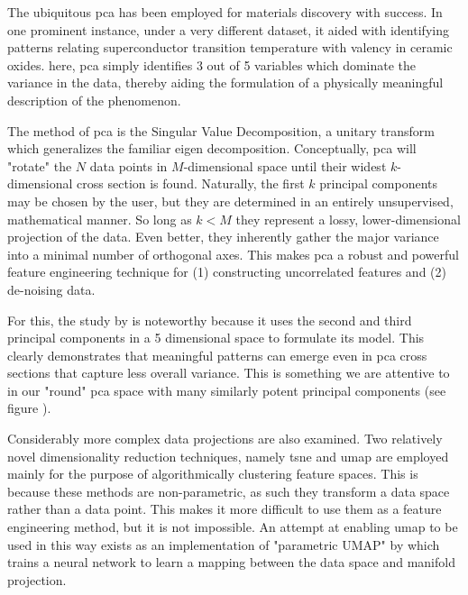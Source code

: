 \documentclass[twoside, twocolumn, 9pt, draft]{article}
\begin{document}
The ubiquitous \acrfull{pca} has been employed
for materials discovery with success. In one prominent instance, under
a very different dataset, it aided with identifying patterns relating
superconductor transition temperature with valency in ceramic
oxides\cite{rajan-2009-princ-compon}. here, pca simply identifies 3 out
of 5 variables which dominate the variance in the data, thereby aiding
the formulation of a physically meaningful description of the
phenomenon.

The method of \acrshort{pca} is the Singular Value Decomposition, a unitary
transform which generalizes the familiar eigen decomposition.
Conceptually, \acrshort{pca} will "rotate" the \(N\) data points in
\(M\)-dimensional space until their widest \(k\)-dimensional cross
section is found. Naturally, the first \(k\) principal components may
be chosen by the user, but they are determined in an entirely
unsupervised, mathematical manner. So long as \(k<M\) they represent a
lossy, lower-dimensional projection of the data. Even better, they
inherently gather the major variance into a minimal number of
orthogonal axes. This makes \acrshort{pca} a robust and powerful feature
engineering technique for (1) constructing uncorrelated
features\cite{mahoney-2009-cur-matrix} and (2) de-noising data.

For this, the study by \citet{rajan-2009-princ-compon} is noteworthy
because it uses the second and third principal components in a 5
dimensional space to formulate its model. This clearly demonstrates
that meaningful patterns can emerge even in \acrshort{pca} cross sections that
capture less overall variance. This is something we are attentive to
in our "round" \acrshort{pca} space with many similarly potent principal
components (see figure \label{fig:scree}).

Considerably more complex data projections are also examined. Two
relatively novel dimensionality reduction techniques, namely
\acrfull{tsne}
\cite{maaten-2008-visual-high} and \Acrfull{umap} \cite{mcinnes-2018-umap} are employed mainly for the
purpose of algorithmically clustering feature spaces. This is because
these methods are non-parametric, as such they transform a data space
rather than a data point. This makes it more difficult to use them as
a feature engineering method, but it is not impossible. An attempt at
enabling \acrshort{umap} to be used in this way exists as an implementation of
"parametric UMAP" by \citet{mcinnes-2018-python-umap} which trains a
neural network to learn a mapping between the data space and manifold
projection.
\end{document}
